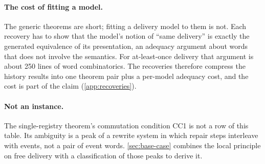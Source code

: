 \paragraph{The cost of fitting a model.}
The generic theorems are short; fitting a delivery model to them is not. Each recovery has to show
that the model's notion of ``same delivery'' is exactly the generated equivalence of its presentation,
an adequacy argument about words that does not involve the semantics. For at-least-once delivery that
argument is about 250 lines of word combinatorics. The recoveries therefore compress the history
results into one theorem pair plus a per-model adequacy cost, and the cost is part of the claim
(\cref{app:recoveries}).

\paragraph{Not an instance.}
The single-registry theorem's commutation condition CC1 is not a row of this table. Its ambiguity is a
peak of a rewrite system in which repair steps interleave with events, not a pair of event words.
\cref{sec:base-case} combines the local principle on free delivery with a classification of those peaks to derive it.
